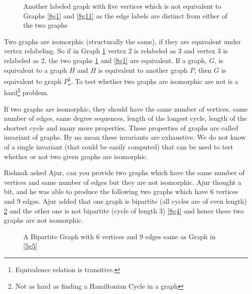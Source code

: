 \begin{figure}
\begin{center}
\caption{ Another labeled graph with five vertices which is not equivalent to Graphs \ref{8g1} and \ref{8g11} as the edge labels are distinct from either of the two graphs}\label{8g2}
\end{center}
\end{figure}

Two graphs are isomorphic (structurally the same), if they are equivalent under vertex relabeling. So if in Graph \ref{8g2} vertex 2 is relabeled as 3 and vertex 3 is relabeled as 2, the two graphs \ref{8g2} and \ref{8g1} are equivalent. If a graph, $G$, is equivalent to a graph $H$ and $H$ is equivalent to another graph $P$, then $G$ is equivalent to graph $P$\footnote{Equivalence relation is transitive.}. To test whether two graphs are isomorphic are not is a hard\footnote{Not as hard as finding a Hamiltonian Cycle in a graph} problem.

If two graphs are isomorphic, they should have the same number of vertices, same number of edges, same degree sequences, length of the longest cycle, length of the shortest cycle and many more properties.  These properties of graphs are called invariant of graphs. By no mean these invariants are exhaustive. We do not know of a single invariant (that could be easily computed) that can be used to test whether or not two given graphs are isomorphic. 

Rishnak asked Ajur, can you provide two graphs which have the same number of vertices and same number of edges but they are not isomorphic. Ajur thought a bit, and he was able to produce the following two graphs which have 6 vertices and 9 edges. Ajur added that one graph is bipartite (all cycles are of even length) \ref{8g3} and the other one is not bipartite (cycle of length 3) \ref{8g4} and hence these two graphs are not isomorphic.

\begin{figure}

\caption{ A Bipartite Graph with 6 vertices and 9 edges same as Graph in \ref{5g5}}\label{8g3}

\end{figure}

